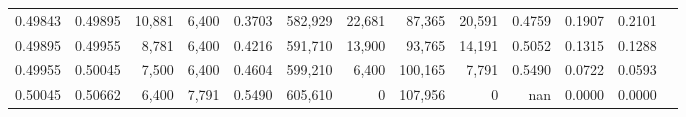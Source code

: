 \begin{tabular}{rrrrrrrrrrrrr}
0.49843 & 0.49895 &  10,881 & 6,400 &                                     0.3703 & 582,929 &  22,681 &  87,365 &  20,591 & 0.4759 & 0.1907 & 0.2101 \\
0.49895 & 0.49955 &   8,781 & 6,400 &                                     0.4216 & 591,710 &  13,900 &  93,765 &  14,191 & 0.5052 & 0.1315 & 0.1288 \\
0.49955 & 0.50045 &   7,500 & 6,400 &                                     0.4604 & 599,210 &   6,400 & 100,165 &   7,791 & 0.5490 & 0.0722 & 0.0593 \\
0.50045 & 0.50662 &   6,400 & 7,791 &                                     0.5490 & 605,610 &       0 & 107,956 &       0 &    nan & 0.0000 & 0.0000 \\
\bottomrule
\end{tabular}
